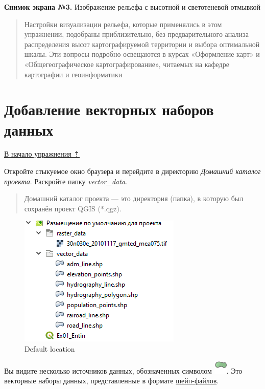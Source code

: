 \documentclass[
  12pt,
]{book}
\begin{document}
\textbf{Снимок экрана №3.} Изображение рельефа с высотной и светотеневой отмывкой

\begin{quote}
Настройки визуализации рельефа, которые применялись в этом упражнении, подобраны приблизительно, без предварительного анализа распределения высот картографируемой территории и выбора оптимальной шкалы. Эти вопросы подробно освещаются в курсах «Оформление карт» и «Общегеографическое картографирование», читаемых на кафедре картографии и геоинформатики
\end{quote}

\hypertarget{map-design-general-vector}{%
\section{Добавление векторных наборов данных}\label{map-design-general-vector}}

\protect\hyperlink{map-design-general}{В начало упражнения ⇡}

Откройте стыкуемое окно браузера и перейдите в директорию \emph{Домашний каталог проекта}. Раскройте папку \emph{vector\_data}.

\begin{quote}
Домашний каталог проекта --- это директория (папка), в которую был сохранён проект QGIS (*.qgz).
\end{quote}

\begin{figure}
\centering
\includegraphics{images/Ex01/DefaultLocation.png}
\caption{Default location}
\end{figure}

Вы видите несколько источников данных, обозначенных символом \includegraphics{images/Ex01/polygon.png}. Это векторные наборы данных, представленные в формате \href{https://desktop.arcgis.com/ru/arcmap/latest/manage-data/shapefiles/what-is-a-shapefile.htm}{шейп-файлов}.
\end{document}
